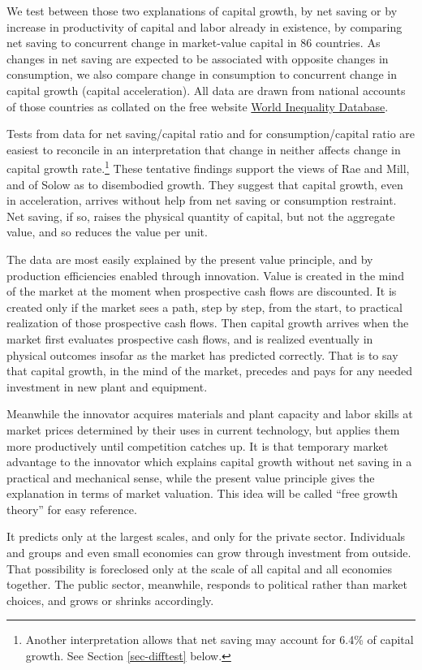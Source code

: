 \documentclass[a4paper,fleqn]{latex_styles/cas-sc}
\begin{document}
We test between those two explanations of capital growth, by net
saving or by increase in productivity of capital and labor already
in existence, by comparing net saving to concurrent change in
market-value capital in 86 countries. As changes in net saving
are expected to be associated with opposite changes in consumption, we
also compare change in consumption to concurrent change in capital
growth (capital acceleration). All data are drawn from national accounts
of those countries as collated on the free website \href{https://wid.world/}{World Inequality Database}.

Tests from data for net saving/capital ratio and for consumption/capital ratio
are easiest to reconcile in an interpretation that change in neither affects
change in capital growth rate.\footnote{Another interpretation allows that net
saving may account for 6.4\% of capital growth. See Section \ref{sec-difftest}
below.} These tentative findings support the views of Rae and Mill, and of
Solow as to disembodied growth. They suggest that capital growth, even in
acceleration, arrives without help from net saving or consumption restraint.
Net saving, if so, raises the physical quantity of capital, but not the
aggregate value, and so reduces the value per unit.

The data are most easily explained by the present value principle,
and by production efficiencies enabled through innovation. Value is
created in the mind of the market at the moment when prospective cash
flows are discounted. It is created only if the market sees a path, step
by step, from the start, to practical realization of those prospective
cash flows. Then capital growth arrives when the market first evaluates
prospective cash flows, and is realized eventually in physical outcomes
insofar as the market has predicted correctly. That is to say that capital
growth, in the mind of the market, precedes and pays for any needed investment
in new plant and equipment.

Meanwhile the innovator
acquires materials and plant capacity and labor skills at market prices
determined by their uses in current technology, but applies them more
productively until competition catches up. It is that temporary market
advantage to the innovator which explains capital growth without net
saving in a practical and mechanical sense, while the present value
principle gives the explanation in terms of market valuation. This idea
will be called ``free growth theory'' for easy reference.

It predicts only at the largest scales, and only for the private sector.
Individuals and groups and even small economies can grow through
investment from outside. That possibility is foreclosed only at the
scale of all capital and all economies together. The public sector,
meanwhile, responds to political rather than market choices, and grows
or shrinks accordingly.
\end{document}
